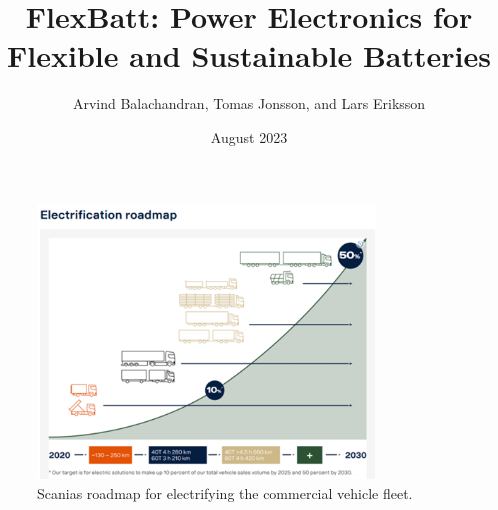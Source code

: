 \documentclass{article}
\title{FlexBatt: Power Electronics for Flexible and Sustainable Batteries}
\author{Arvind Balachandran, Tomas Jonsson, and Lars Eriksson}
\date{August 2023}
\begin{document}
\maketitle

\begin{figure}[!b]
    \centering
    \includegraphics[width=0.8\textwidth]{Figures/EV_sales.png}
    \caption{Scanias roadmap for electrifying the commercial vehicle fleet.}
    \label{fig:EVsales}
\end{figure}
\end{document}
